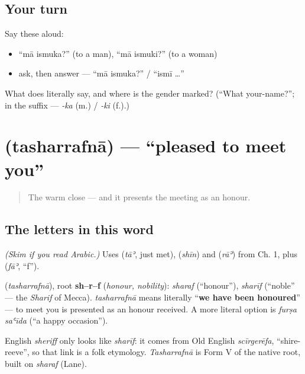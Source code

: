 \subsection*{Your turn}
Say these aloud:

\begin{itemize}
\raggedright
  \item \textquotedblleft{}mā ismuka?\textquotedblright{} (to a man), \textquotedblleft{}mā ismuki?\textquotedblright{} (to a woman)
  \item ask, then answer — \textquotedblleft{}mā ismuka?\textquotedblright{} / \textquotedblleft{}ismī …\textquotedblright{}
\end{itemize}

\begin{tcolorbox}[breakable,colback=teal!4,colframe=teal!35!black,title={Before you move on}]
What does \textbf{ } literally say, and where is the gender marked? (\textquotedblleft{}What your-name?\textquotedblright{}; in the suffix — \emph{-ka} (m.) / \emph{-ki} (f.).)
\end{tcolorbox}
\section[\texorpdfstring{\ar{تشرفنا} (tasharrafnā)}{تشرفنا (tasharrafnā)}]{ (tasharrafnā) — \textquotedblleft{}pleased to meet you\textquotedblright{}}

\label{lesson:AR-C02-tasharrafna}



\begin{quote}
The warm close — and it presents the meeting as an honour.
\end{quote}

\subsection*{The letters in this word}
\emph{(Skim if you read Arabic.)} Uses \textbf{} (\emph{tāʾ}, just met), \textbf{} (\emph{shīn}) and \textbf{} (\emph{rāʾ}) from Ch. 1, plus \textbf{} (\emph{fāʾ}, \textquotedblleft{}f\textquotedblright{}).

\begin{cousinweb}
\textbf{} (\emph{tasharrafnā}), root \textbf{sh–r–f} (\emph{honour, nobility}): \emph{sharaf} (\textquotedblleft{}honour\textquotedblright{}), \emph{sharīf} (\textquotedblleft{}noble\textquotedblright{} — the \emph{Sharif} of Mecca). \emph{tasharrafnā} means literally \textquotedblleft{}\textbf{we have been honoured}\textquotedblright{} — to meet you is presented as an honour received. A more literal option is \emph{furṣa saʿīda} (\textquotedblleft{}a happy occasion\textquotedblright{}).

English \emph{sheriff} only looks like \emph{sharīf}: it comes from Old English \emph{scīrgerēfa}, \textquotedblleft{}shire-reeve\textquotedblright{}, so that link is a folk etymology. \emph{Tasharrafnā} is Form V of the native root, built on \emph{sharaf} (Lane).
\end{cousinweb}

